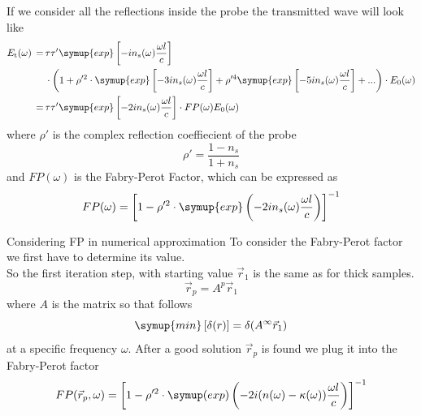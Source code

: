\documentclass[aspectratio=1610, 9pt]{beamer}
\begin{document}
\begin{frame}
  If we consider all the reflections inside the probe the transmitted wave will look like
  \begin{align*}
    E_\text{t}(\omega) \,=\,& \tau \tau' \symup{exp} \left[-i n_s(\omega) \frac{\omega l }{c}\right] \\
                        & \cdot \left( 1 + \rho'^2 \cdot \symup{exp}\left[ -3 i n_s(\omega) \frac{\omega l }{c}\right] + \rho'^4 \symup{exp} \left[ -5 i n_s(\omega) \frac{\omega l }{c}\right] + ...\right) \cdot E_0 (\omega) \\
                        \,=\,& \tau \tau' \symup{exp}\left[ -2 i n_s(\omega) \frac{\omega l }{c}\right] \cdot FP(\omega) E_0(\omega)
  \end{align*}
  where $\rho'$ is the complex reflection coeffiecient of the probe
  \begin{equation}
    \rho' = \frac{1 - n_s}{1 + n_s}
  \end{equation}
  and $FP(\omega)$ is the Fabry-Perot Factor, which can be expressed as 
  \begin{equation}
    FP(\omega) = \left[1 - \rho'^2 \cdot \symup{exp}\left(- 2 i n_s(\omega )\frac{\omega l }{c}\right)\right]^{-1}
  \end{equation}
\end{frame}

\begin{frame}{Considering FP in numerical approximation}
  To consider the Fabry-Perot factor we first have to determine its value.\\
  So the first iteration step, with starting value $\vec{r}_1$ is the same as for thick samples.
  \begin{equation}
    \vec{r}_p = A^p \vec{r}_1
  \end{equation}  
  where $A$ is the matrix so that follows
  \begin{equation}
    \symup{min} \left[ \delta(r)\right] = \delta(A^\infty \vec{r}_1)
  \end{equation}
  at a specific frequency $\omega$.
  After a good solution $\vec{r}_p$ is found we plug it into the Fabry-Perot factor
  \begin{equation}
    FP(\vec{r}_p, \omega) = \left[1 - \rho'^2 \cdot \symup(exp)\left(- 2 i (n(\omega) - \kappa(\omega))\frac{\omega l }{c}\right)\right]^{-1}
  \end{equation}
\end{frame}
\end{document}
